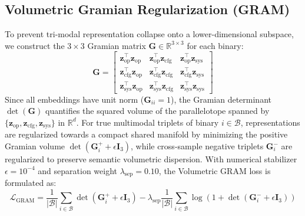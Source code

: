 \documentclass[pdflatex,sn-mathphys-num]{sn-jnl}
\begin{document}
\subsection{Volumetric Gramian Regularization (GRAM)}\label{sec:math_gram}
To prevent tri-modal representation collapse onto a lower-dimensional subspace, we construct the $3 \times 3$ Gramian matrix $\mathbf{G} \in \mathbb{R}^{3 \times 3}$ for each binary:
\begin{equation}
\mathbf{G} = \begin{bmatrix}
\mathbf{z}_{\text{op}}^\top \mathbf{z}_{\text{op}} & \mathbf{z}_{\text{op}}^\top \mathbf{z}_{\text{cfg}} & \mathbf{z}_{\text{op}}^\top \mathbf{z}_{\text{sys}} \\
\mathbf{z}_{\text{cfg}}^\top \mathbf{z}_{\text{op}} & \mathbf{z}_{\text{cfg}}^\top \mathbf{z}_{\text{cfg}} & \mathbf{z}_{\text{cfg}}^\top \mathbf{z}_{\text{sys}} \\
\mathbf{z}_{\text{sys}}^\top \mathbf{z}_{\text{op}} & \mathbf{z}_{\text{sys}}^\top \mathbf{z}_{\text{cfg}} & \mathbf{z}_{\text{sys}}^\top \mathbf{z}_{\text{sys}}
\end{bmatrix}
\end{equation}
Since all embeddings have unit norm ($\mathbf{G}_{ii} = 1$), the Gramian determinant $\det(\mathbf{G})$ quantifies the squared volume of the parallelotope spanned by $\{\mathbf{z}_{\text{op}}, \mathbf{z}_{\text{cfg}}, \mathbf{z}_{\text{sys}}\}$ in $\mathbb{R}^{d}$. For true multimodal triplets of binary $i \in \mathcal{B}$, representations are regularized towards a compact shared manifold by minimizing the positive Gramian volume $\det(\mathbf{G}_i^+ + \epsilon \mathbf{I}_3)$, while cross-sample negative triplets $\mathbf{G}_i^-$ are regularized to preserve semantic volumetric dispersion. With numerical stabilizer $\epsilon = 10^{-4}$ and separation weight $\lambda_{\text{sep}} = 0.10$, the Volumetric GRAM loss is formulated as:
\begin{equation}
\mathcal{L}_{\text{GRAM}} = \frac{1}{|\mathcal{B}|} \sum_{i \in \mathcal{B}} \det(\mathbf{G}_i^+ + \epsilon \mathbf{I}_3) - \lambda_{\text{sep}} \frac{1}{|\mathcal{B}|} \sum_{i \in \mathcal{B}} \log\left(1 + \det(\mathbf{G}_i^- + \epsilon \mathbf{I}_3)\right)
\end{equation}
\end{document}
